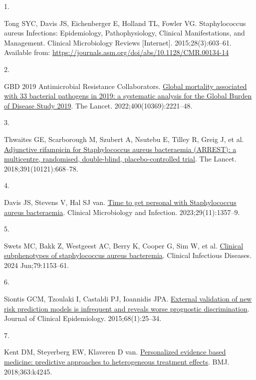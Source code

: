 \documentclass[
  letterpaper,
  DIV=11,
  numbers=noendperiod]{scrartcl}
\newlength{\cslhangindent}
\newlength{\csllabelwidth}
\newenvironment{CSLReferences}[2] %
 {\begin{list}{}{%
  \setlength{\itemindent}{0pt}
  \setlength{\leftmargin}{0pt}
  \setlength{\parsep}{0pt}
  \ifodd #1
   \setlength{\leftmargin}{\cslhangindent}
   \setlength{\itemindent}{-1\cslhangindent}
  \fi
  \setlength{\itemsep}{#2\baselineskip}}}
 {\end{list}}
\newcommand{\CSLLeftMargin}[1]{\parbox[t]{\csllabelwidth}{\strut#1\strut}}
\newcommand{\CSLRightInline}[1]{\parbox[t]{\linewidth - \csllabelwidth}{\strut#1\strut}}
\begin{document}
\label{refs}
\begin{CSLReferences}{0}{1}
\CSLLeftMargin{1. }%
\CSLRightInline{Tong SYC, Davis JS, Eichenberger E, Holland TL, Fowler
VG. {Staphylococcus aureus Infections: Epidemiology, Pathophysiology,
Clinical Manifestations, and Management}. Clinical Microbiology Reviews
{[}Internet{]}. 2015;28(3):603--61. Available from:
\url{https://journals.asm.org/doi/abs/10.1128/CMR.00134-14}}

\CSLLeftMargin{2. }%
\CSLRightInline{GBD 2019 Antimicrobial Resistance Collaborators.
\href{https://doi.org/10.1016/S0140-6736(22)02185-7}{{Global mortality
associated with 33 bacterial pathogens in 2019: a systematic analysis
for the Global Burden of Disease Study 2019}}. The Lancet.
2022;400(10369):2221--48. }

\CSLLeftMargin{3. }%
\CSLRightInline{Thwaites GE, Scarborough M, Szubert A, Nsutebu E, Tilley
R, Greig J, et al.
\href{https://doi.org/10.1016/S0140-6736(17)32446-X}{{Adjunctive
rifampicin for Staphylococcus aureus bacteraemia (ARREST): a
multicentre, randomised, double-blind, placebo-controlled trial}}. The
Lancet. 2018;391(10121):668--78. }

\CSLLeftMargin{4. }%
\CSLRightInline{Davis JS, Stevens V, Hal SJ van.
\href{https://doi.org/10.1016/j.cmi.2023.07.017}{{Time to get personal
with Staphylococcus aureus bacteraemia}}. Clinical Microbiology and
Infection. 2023;29(11):1357--9. }

\CSLLeftMargin{5. }%
\CSLRightInline{Swets MC, Bakk Z, Westgeest AC, Berry K, Cooper G, Sim
W, et al. \href{https://doi.org/10.1093/cid/ciae338}{Clinical
subphenotypes of staphylococcus aureus bacteremia}. Clinical Infectious
Diseases. 2024 Jun;79:1153--61. }

\CSLLeftMargin{6. }%
\CSLRightInline{Siontis GCM, Tzoulaki I, Castaldi PJ, Ioannidis JPA.
\href{https://doi.org/10.1016/j.jclinepi.2014.09.007}{{External
validation of new risk prediction models is infrequent and reveals worse
prognostic discrimination}}. Journal of Clinical Epidemiology.
2015;68(1):25--34. }

\CSLLeftMargin{7. }%
\CSLRightInline{Kent DM, Steyerberg EW, Klaveren D van.
\href{https://doi.org/10.1136/bmj.k4245}{{Personalized evidence based
medicine: predictive approaches to heterogeneous treatment effects}}.
BMJ. 2018;363:k4245. }


\end{CSLReferences}
\end{document}
